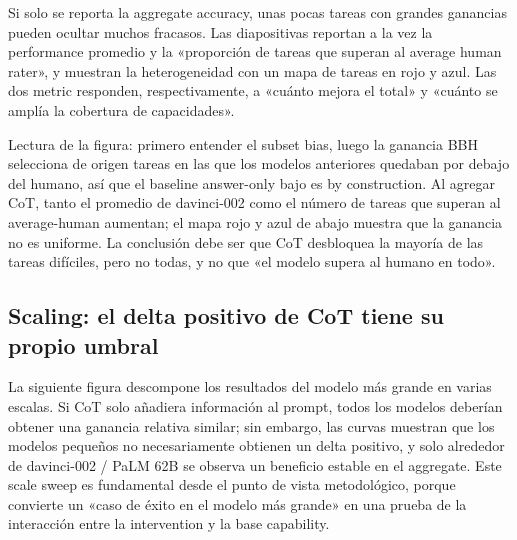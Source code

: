 Si solo se reporta la aggregate accuracy, unas pocas tareas con grandes ganancias pueden ocultar muchos fracasos. Las diapositivas reportan a la vez la performance promedio y la «proporción de tareas que superan al average human rater», y muestran la heterogeneidad con un mapa de tareas en rojo y azul. Las dos metric responden, respectivamente, a «cuánto mejora el total» y «cuánto se amplía la cobertura de capacidades».


\begin{knowledgebox}{Lectura de la figura: primero entender el subset bias, luego la ganancia}
BBH selecciona de origen tareas en las que los modelos anteriores quedaban por debajo del humano, así que el baseline answer-only bajo es by construction. Al agregar CoT, tanto el promedio de davinci-002 como el número de tareas que superan al average-human aumentan; el mapa rojo y azul de abajo muestra que la ganancia no es uniforme. La conclusión debe ser que CoT desbloquea la mayoría de las tareas difíciles, pero no todas, y no que «el modelo supera al humano en todo».
\end{knowledgebox}


\subsection{Scaling: el delta positivo de CoT tiene su propio umbral}

La siguiente figura descompone los resultados del modelo más grande en varias escalas. Si CoT solo añadiera información al prompt, todos los modelos deberían obtener una ganancia relativa similar; sin embargo, las curvas muestran que los modelos pequeños no necesariamente obtienen un delta positivo, y solo alrededor de davinci-002 / PaLM 62B se observa un beneficio estable en el aggregate. Este scale sweep es fundamental desde el punto de vista metodológico, porque convierte un «caso de éxito en el modelo más grande» en una prueba de la interacción entre la intervention y la base capability.

